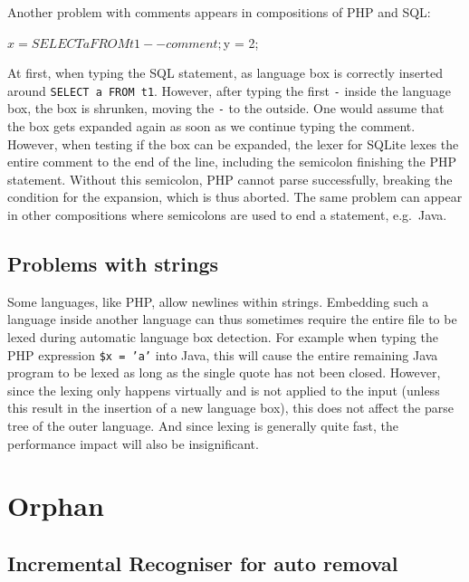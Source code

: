 \documentclass[sigplan,screen]{acmart}\settopmatter{printfolios=true,printccs=false,printacmref=false}
\begin{document}
Another problem with comments appears in compositions of PHP and SQL:

\begin{lstdefault}[language=PHP]
$x = SELECT a FROM t1 -- comment;
$y = 2;
\end{lstdefault}

At first, when typing the SQL statement, as language box is correctly inserted
around \verb|SELECT a FROM t1|. However, after typing the first \texttt{-}
inside the language box, the box is shrunken, moving the \texttt{-} to the
outside. One would assume that the box gets expanded again as soon as we
continue typing the comment. However, when testing if the box can be expanded,
the lexer for SQLite lexes the entire comment to the end of the line, including
the semicolon finishing the PHP statement. Without this semicolon, PHP cannot
parse successfully, breaking the condition for the expansion, which is thus
aborted. The same problem can appear in other compositions where semicolons are
used to end a statement, e.g.~Java.

\subsection{Problems with strings}

Some languages, like PHP, allow newlines within strings. Embedding such a
language inside another language can thus sometimes require the entire file to
be lexed during automatic language box detection. For example when typing the
PHP expression \texttt{\$x = 'a'} into Java, this will cause the entire
remaining Java program to be lexed as long as the single quote has not been
closed. However, since the lexing only happens virtually and is not applied to
the input (unless this result in the insertion of a new language box), this
does not affect the parse tree of the outer language. And since lexing is
generally quite fast, the performance impact will also be insignificant.


\section{Orphan}

\subsection{Incremental Recogniser for auto removal}
\label{sec:impl_removerec}
\end{document}
